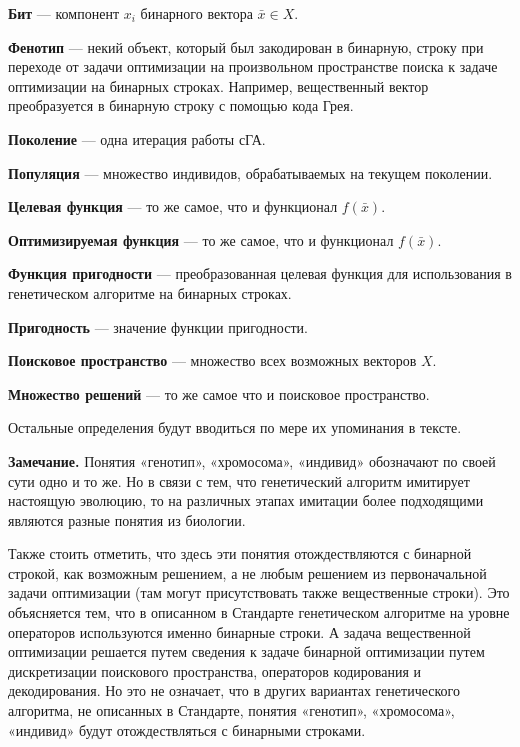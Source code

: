 \textbf{Бит} --- компонент $ x_i $ бинарного вектора $\bar{x}\in X$.

\textbf{Фенотип} --- некий объект, который был закодирован в бинарную, строку при переходе от задачи оптимизации на произвольном пространстве поиска к задаче оптимизации на бинарных строках. Например, вещественный вектор преобразуется в бинарную строку с помощью кода Грея.

\textbf{Поколение} --- одна итерация работы сГА.

\textbf{Популяция} --- множество индивидов, обрабатываемых на текущем поколении.

\textbf{Целевая функция} --- то же самое, что и функционал $ f\left( \bar{x}\right)  $.

\textbf{Оптимизируемая функция} --- то же самое, что и функционал $ f\left( \bar{x}\right)  $.

\textbf{Функция пригодности} --- преобразованная целевая функция для использования в генетическом алгоритме на бинарных строках.

\textbf{Пригодность} --- значение функции пригодности.

\textbf{Поисковое пространство} --- множество всех возможных векторов $ X $.

\textbf{Множество решений} --- то же самое что и поисковое пространство.

Остальные определения будут вводиться по мере их упоминания в тексте.

\textbf{Замечание.} Понятия «генотип», «хромосома», «индивид» обозначают по своей сути одно и то же. Но в связи с тем, что генетический алгоритм имитирует настоящую эволюцию, то на различных этапах имитации более подходящими являются разные понятия из биологии.

Также стоить отметить, что здесь эти понятия отождествляются с бинарной строкой, как возможным решением, а не любым решением из первоначальной задачи оптимизации (там могут присутствовать также вещественные строки). Это объясняется тем, что в описанном в Стандарте генетическом алгоритме на уровне операторов используются именно бинарные строки. А задача вещественной оптимизации решается путем сведения к задаче бинарной оптимизации путем дискретизации поискового пространства, операторов кодирования и декодирования. Но это не означает, что в других вариантах генетического алгоритма, не описанных в Стандарте, понятия «генотип», «хромосома», «индивид» будут отождествляться с бинарными строками.

\clearpage